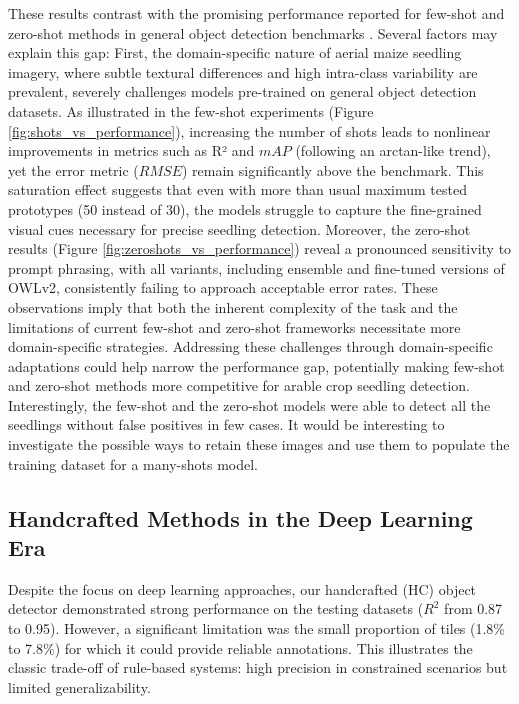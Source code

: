 \documentclass[journal,article,submit,pdftex,moreauthors]{Definitions/mdpi}
\begin{document}
These results contrast with the promising performance reported for few-shot and zero-shot methods 
in general object detection benchmarks \cite{xuDeViTDecomposingVision2023,mindererScalingOpenVocabularyObject2023}. 
Several factors may explain this gap: 
First, the domain-specific nature of aerial maize seedling imagery, where subtle 
textural differences and high intra-class variability are prevalent, severely challenges 
models pre-trained on general object detection datasets. As illustrated in the few-shot 
experiments (Figure \ref{fig:shots_vs_performance}), increasing 
the number of shots leads to nonlinear improvements in metrics such as R² and $mAP$ 
(following an arctan-like trend), yet the error metric ($RMSE$) remain significantly 
above the benchmark. This saturation effect suggests that even with more than usual maximum tested
prototypes (50 instead of 30), the models struggle to capture the fine-grained visual cues 
necessary for precise seedling detection. Moreover, the zero-shot results (Figure 
\ref{fig:zeroshots_vs_performance}) reveal a pronounced sensitivity to prompt phrasing, with all 
variants, including ensemble and fine-tuned versions of OWLv2, consistently failing 
to approach acceptable error rates. These observations imply that both the inherent 
complexity of the task and the limitations of current few-shot and zero-shot frameworks 
necessitate more domain-specific strategies. Addressing these challenges through 
domain-specific adaptations could help narrow the performance gap, potentially making 
few-shot and zero-shot methods more competitive for arable crop seedling detection.
Interestingly, the few-shot and the zero-shot models were able to detect all the seedlings
without false positives in few cases. It would be interesting to investigate the
possible ways to retain these images and use them to populate the training dataset
for a many-shots model.

\subsection{Handcrafted Methods in the Deep Learning Era}
Despite the focus on deep learning approaches, our handcrafted (HC) object detector 
demonstrated strong performance on the testing datasets ($R^2$ from 0.87 to 0.95). 
However, a significant limitation was the small proportion of tiles (1.8\% to 7.8\%) 
for which it could provide reliable annotations. This illustrates the classic trade-off 
of rule-based systems: high precision in constrained scenarios but limited generalizability.
\end{document}
